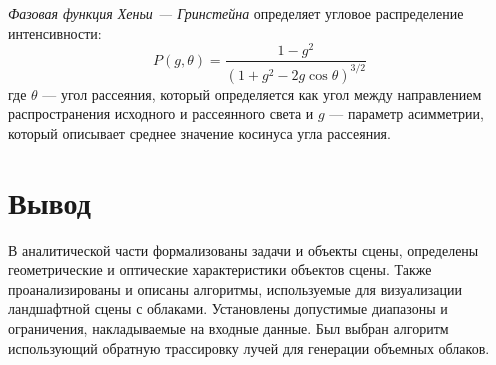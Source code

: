 \textit{Фазовая функция Хеньи — Гринстейна} определяет угловое распределение интенсивности:
\begin{equation}
	\label{eq:henyey-greenstein}
	P(g, \theta) = \frac{1 - g^2}{(1 + g^2 - 2g \cos\theta)^{3/2}}
\end{equation} где 
$\theta$ — угол рассеяния, который определяется как угол между направлением распространения исходного и рассеянного света и $g$ — параметр асимметрии, который описывает среднее значение косинуса угла рассеяния.

\section*{Вывод}
В аналитической части формализованы задачи и объекты сцены, определены геометрические и оптические характеристики объектов сцены. Также проанализированы и описаны алгоритмы, используемые для визуализации ландшафтной сцены с облаками. Установлены допустимые диапазоны и ограничения, накладываемые на входные данные.
Был выбран алгоритм использующий обратную трассировку лучей для генерации объемных облаков.%
